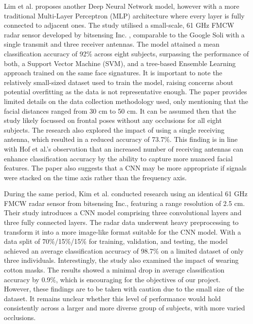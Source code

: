 \documentclass{mpaper}
\begin{document}
Lim et al. \cite{lim2020dnn} proposes another Deep Neural Network model, however with a more traditional Multi-Layer Perceptron (MLP) architecture where every layer is fully connected to adjacent ones. The study utilised a small-scale, 61 GHz FMCW radar sensor developed by bitsensing Inc. \cite{bitsensing2020bts60}, comparable to the Google Soli with a single transmit and three receiver antennas. The model attained a mean classification accuracy of 92\% across eight subjects, surpassing the performance of both, a Support Vector Machine (SVM), and a tree-based Ensemble Learning approach trained on the same face signatures. It is important to note the relatively small-sized dataset used to train the model, raising concerns about potential overfitting as the data is not representative enough. The paper provides limited details on the data collection methodology used, only mentioning that the facial distances ranged from 30 cm to 50 cm. It can be assumed then that the study likely focussed on frontal poses without any occlusions for all eight subjects. The research also explored the impact of using a single receiving antenna, which resulted in a reduced accuracy of 73.7\%. This finding is in line with Hof et al.'s \cite{hof2020face} observation that an increased number of receiving antennas can enhance classification accuracy by the ability to capture more nuanced facial features. The paper also suggests that a CNN may be more appropriate if signals were stacked on the time axis rather than the frequency axis.

During the same period, Kim et al. \cite{kim2020face} conducted research using an identical 61 GHz FMCW radar sensor from bitsensing Inc., featuring a range resolution of 2.5 cm. Their study introduces a CNN model comprising three convolutional layers and three fully connected layers. The radar data underwent heavy preprocessing to transform it into a more image-like format suitable for the CNN model. With a data split of 70\%/15\%/15\% for training, validation, and testing, the model achieved an average classification accuracy of 98.7\% on a limited dataset of only three individuals. Interestingly, the study also examined the impact of wearing cotton masks. The results showed a minimal drop in average classification accuracy by 0.9\%, which is encouraging for the objectives of our project. However, these findings are to be taken with caution due to the small size of the dataset. It remains unclear whether this level of performance would hold consistently across a larger and more diverse group of subjects, with more varied occlusions.
\end{document}
